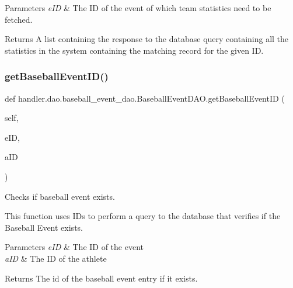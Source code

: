 \begin{DoxyParams}{Parameters}
{\em e\+ID} & The ID of the event of which team statistics need to be fetched.\\
\hline
\end{DoxyParams}
\begin{DoxyReturn}{Returns}
A list containing the response to the database query containing all the statistics in the system containing the matching record for the given ID. 
\end{DoxyReturn}
\mbox{\label{classhandler_1_1dao_1_1baseball__event__dao_1_1_baseball_event_d_a_o_ab2535a0719ba0a98cc22a5bc2ec4eda3}} 
\subsubsection{\texorpdfstring{get\+Baseball\+Event\+I\+D()}{getBaseballEventID()}}
{\footnotesize\ttfamily def handler.\+dao.\+baseball\+\_\+event\+\_\+dao.\+Baseball\+Event\+D\+A\+O.\+get\+Baseball\+Event\+ID (\begin{DoxyParamCaption}\item[{}]{self,  }\item[{}]{e\+ID,  }\item[{}]{a\+ID }\end{DoxyParamCaption})}



Checks if baseball event exists. 

This function uses I\+Ds to perform a query to the database that verifies if the Baseball Event exists.


\begin{DoxyParams}{Parameters}
{\em e\+ID} & The ID of the event \\
\hline
{\em a\+ID} & The ID of the athlete\\
\hline
\end{DoxyParams}
\begin{DoxyReturn}{Returns}
The id of the baseball event entry if it exists. 
\end{DoxyReturn}
\mbox{\label{classhandler_1_1dao_1_1baseball__event__dao_1_1_baseball_event_d_a_o_a99e3b387e34c9d63c524f61567e3b9c2}} 
